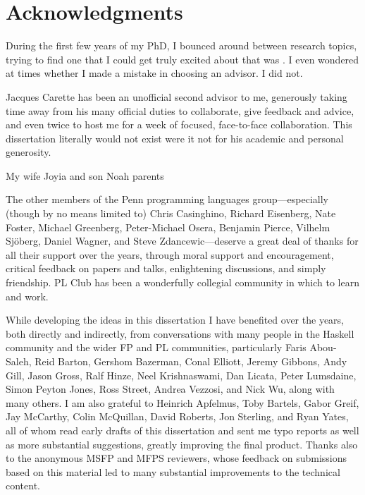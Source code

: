 
\newpage
\chapter*{Acknowledgments}

During the first few years of my PhD, I bounced around between
research topics, trying to find one that I could get truly excited
about that was . I even wondered at times whether
I made a mistake in choosing an advisor.  I did not. 

Jacques Carette has been an unofficial second advisor to me,
generously taking time away from his many official duties to
collaborate, give feedback and advice, and even twice to host me for a
week of focused, face-to-face collaboration.  This dissertation
literally would not exist were it not for his academic and personal
generosity.

My wife Joyia and son Noah   parents 

The other members of the Penn programming languages group---especially
(though by no means limited to) Chris Casinghino, Richard Eisenberg,
Nate Foster, Michael Greenberg, Peter-Michael Osera, Benjamin Pierce,
Vilhelm Sj\"oberg, Daniel Wagner, and Steve Zdancewic---deserve a
great deal of thanks for all their support over the years, through
moral support and encouragement, critical feedback on papers and
talks, enlightening discussions, and simply friendship.  PL Club has
been a wonderfully collegial community in which to learn and work.

While developing the ideas in this dissertation I have benefited over
the years, both directly and indirectly, from conversations with many
people in the Haskell community and the wider FP and PL communities,
particularly Faris Abou-Saleh, Reid Barton, Gershom Bazerman, Conal
Elliott, Jeremy Gibbons, Andy Gill, Jason Gross, Ralf Hinze, Neel
Krishnaswami, Dan Licata, Peter Lumsdaine, Simon Peyton Jones, Ross
Street, Andrea Vezzosi, and Nick Wu, along with many others.  I am
also grateful to Heinrich Apfelmus, Toby Bartels, Gabor Greif, Jay
McCarthy, Colin McQuillan, David Roberts, Jon Sterling, and Ryan
Yates, all of whom read early drafts of this dissertation and sent me
typo reports as well as more substantial suggestions, greatly
improving the final product.  Thanks also to the anonymous MSFP and
MFPS reviewers, whose feedback on submissions based on this material
led to many substantial improvements to the technical content.

